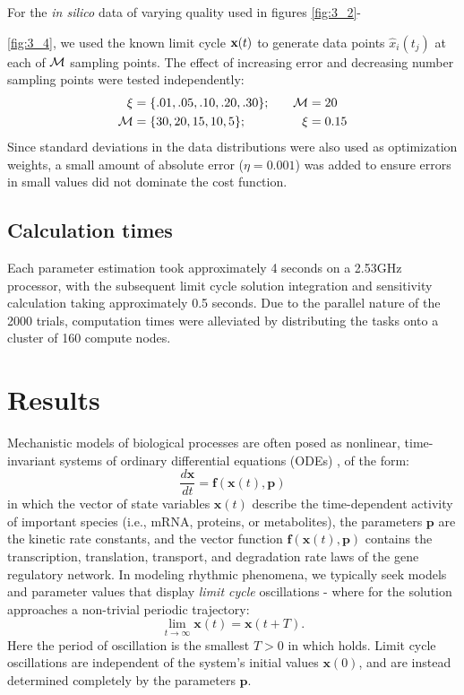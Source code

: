 For the {\itshape in silico} data of varying quality used in figures \ref{fig:3_2}-{\ref{fig:3_4}, we used the known limit cycle ${\bf x}(t)$ to generate data points $\hat{x}_i(t_j)$ at each of $\cal M$ sampling points. 
The effect of increasing error and decreasing number sampling points were tested independently:
\begin{alignat*}{2}
     \xi &=  \{ .01, .05, .10, .20, .30\}; \quad & {\cal M} &= 20 \\
     {\cal M} &=  \{ 30, 20, 15, 10, 5\}; \; & \xi &= 0.15 
\end{alignat*}
Since standard deviations in the data distributions were also used as optimization weights, a small amount of absolute error ($\eta = 0.001$) was added to ensure errors in small values did not dominate the cost function.

\subsection{Calculation times}
Each parameter estimation took approximately 4 seconds on a 2.53GHz processor, with the subsequent limit cycle solution integration and sensitivity calculation taking approximately 0.5 seconds. 
Due to the parallel nature of the 2000 trials, computation times were alleviated by distributing the tasks onto a cluster of 160 compute nodes.

\section{Results}
Mechanistic models of biological processes are often posed as nonlinear, time-invariant systems of ordinary differential equations (ODEs)
\cite{Leloup2003, Forger2003, Mirsky2009}, of the form:
\begin{equation}
  \frac{d{\bm x}}{dt} = {\bm f}({\bm x}(t), {\bm p})
\end{equation}
in which the vector of state variables ${\bm x}(t)$ describe the time-dependent activity of important species (i.e., mRNA, proteins, or metabolites), the parameters $\bm p$ are the kinetic rate constants, and the vector function ${\bm f}({\bm x}(t), {\bm p})$ contains the transcription, translation, transport, and degradation rate laws of the gene regulatory network. 
In modeling rhythmic phenomena, we typically seek models and parameter values that display {\itshape limit cycle} oscillations - where for the solution approaches a non-trivial periodic trajectory:
\begin{equation} \label{eq:limit}
  \lim_{t \rightarrow \infty} {\bm x}(t) = {\bm x}(t + T).
\end{equation}
Here the period of oscillation is the smallest $T > 0$ in which  holds. 
Limit cycle oscillations are independent of the system's initial values ${\bm x}(0)$, and are instead determined completely by the parameters $\bm p$. 

}
